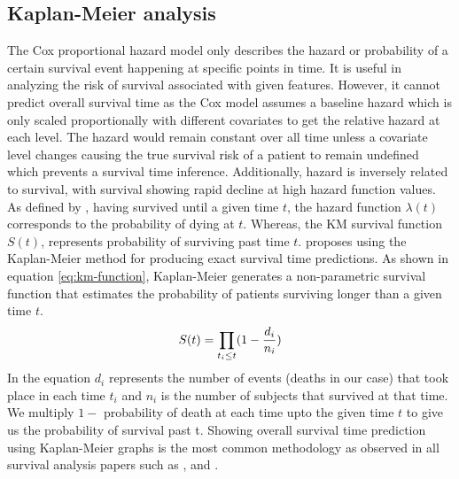 \documentclass{l4proj}
\begin{document}
\subsection{Kaplan-Meier analysis} \label{km-background}
The Cox proportional hazard model only describes the hazard or probability of a certain survival event happening at specific points in time. It is useful in analyzing the risk of survival associated with given features. However, it cannot predict overall survival time as the Cox model assumes a baseline hazard which is only scaled proportionally with different covariates to get the relative hazard at each level. The hazard would remain constant over all time unless a covariate level changes causing the true survival risk of a patient to remain undefined which prevents a survival time inference. Additionally, hazard is inversely related to survival, with survival showing rapid decline at high hazard function values. As defined by \cite{bewick2004statistics}, having survived until a given time \(t\), the hazard function \(\lambda (t)\) corresponds to the probability of dying at \(t\). Whereas, the KM survival function \(S(t)\), represents probability of surviving past time \(t\). \cite{schober2021kaplan} proposes using the Kaplan-Meier method for producing exact survival time predictions. As shown in equation \ref{eq:km-function}, Kaplan-Meier generates a non-parametric survival function that estimates the probability of patients surviving longer than a given time \(t\). 
\begin{equation}
    \centering
    S(t) = \prod_{t_i \leq t} (1 - \frac{d_i}{n_i})
    \label{eq:km-function}
\end{equation}
In the equation \(d_i\) represents the number of events (deaths in our case) that took place in each time \(t_i\) and \(n_i\) is the number of subjects that survived at that time. We multiply \(1 -\) probability of death at each time upto the given time \(t\) to give us the probability of survival past t. 
Showing overall survival time prediction using Kaplan-Meier graphs is the most common methodology as observed in all survival analysis papers such as \cite{Kather2019}, \cite{Liu2022} and \cite{Wetstein2022}.
\end{document}
